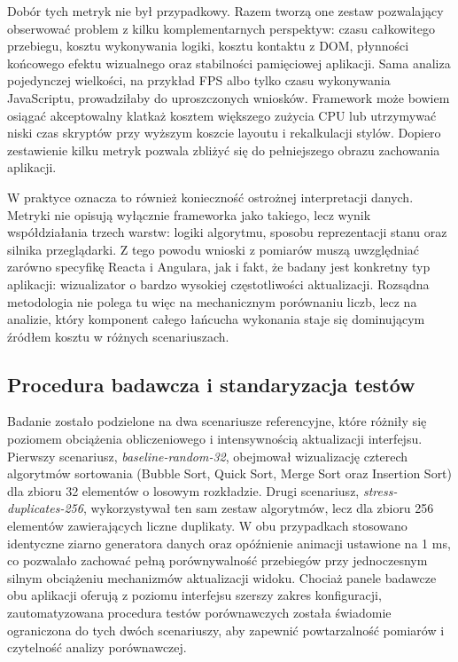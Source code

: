 \documentclass[12pt,openright,twoside]{report}
\begin{document}
  Dobór tych metryk nie był przypadkowy. Razem tworzą one zestaw pozwalający obserwować problem z kilku komplementarnych perspektyw: czasu całkowitego przebiegu, kosztu wykonywania logiki, kosztu kontaktu z DOM, płynności końcowego efektu wizualnego oraz stabilności pamięciowej aplikacji. Sama analiza pojedynczej wielkości, na przykład FPS albo tylko czasu wykonywania JavaScriptu, prowadziłaby do uproszczonych wniosków. Framework może bowiem osiągać akceptowalny klatkaż kosztem większego zużycia CPU lub utrzymywać niski czas skryptów przy wyższym koszcie layoutu i rekalkulacji stylów. Dopiero zestawienie kilku metryk pozwala zbliżyć się do pełniejszego obrazu zachowania aplikacji.

  W praktyce oznacza to również konieczność ostrożnej interpretacji danych. Metryki nie opisują wyłącznie frameworka jako takiego, lecz wynik współdziałania trzech warstw: logiki algorytmu, sposobu reprezentacji stanu oraz silnika przeglądarki. Z tego powodu wnioski z pomiarów muszą uwzględniać zarówno specyfikę Reacta i Angulara, jak i fakt, że badany jest konkretny typ aplikacji: wizualizator o bardzo wysokiej częstotliwości aktualizacji. Rozsądna metodologia nie polega tu więc na mechanicznym porównaniu liczb, lecz na analizie, który komponent całego łańcucha wykonania staje się dominującym źródłem kosztu w różnych scenariuszach.

\subsection{Procedura badawcza i standaryzacja testów}
Badanie zostało podzielone na dwa scenariusze referencyjne, które różniły się poziomem obciążenia obliczeniowego i intensywnością aktualizacji interfejsu. Pierwszy scenariusz, \textit{baseline-random-32}, obejmował wizualizację czterech algorytmów sortowania (Bubble Sort, Quick Sort, Merge Sort oraz Insertion Sort) dla zbioru 32 elementów o losowym rozkładzie. Drugi scenariusz, \textit{stress-duplicates-256}, wykorzystywał ten sam zestaw algorytmów, lecz dla zbioru 256 elementów zawierających liczne duplikaty. W obu przypadkach stosowano identyczne ziarno generatora danych oraz opóźnienie animacji ustawione na 1 ms, co pozwalało zachować pełną porównywalność przebiegów przy jednoczesnym silnym obciążeniu mechanizmów aktualizacji widoku. Chociaż panele badawcze obu aplikacji oferują z poziomu interfejsu szerszy zakres konfiguracji, zautomatyzowana procedura testów porównawczych została świadomie ograniczona do tych dwóch scenariuszy, aby zapewnić powtarzalność pomiarów i czytelność analizy porównawczej.
\end{document}

